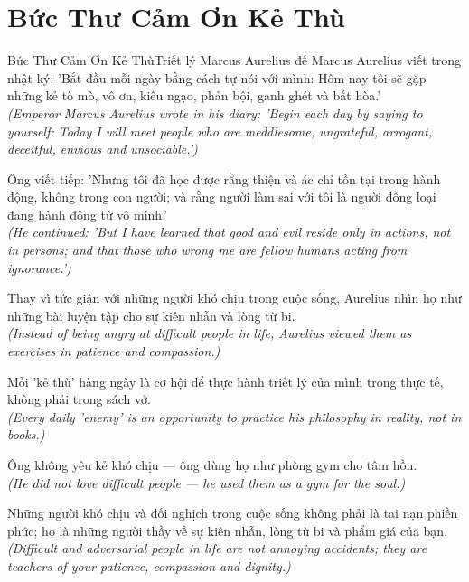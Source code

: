 \section{Bức Thư Cảm Ơn Kẻ Thù}
\begin{truyen}{Bức Thư Cảm Ơn Kẻ Thù}{Triết lý Marcus Aurelius}
 đế Marcus Aurelius viết trong nhật ký: 'Bắt đầu mỗi ngày bằng cách tự nói với mình: Hôm nay tôi sẽ gặp những kẻ tò mò, vô ơn, kiêu ngạo, phản bội, ganh ghét và bất hòa.'\\[4pt]
\textit{(Emperor Marcus Aurelius wrote in his diary: 'Begin each day by saying to yourself: Today I will meet people who are meddlesome, ungrateful, arrogant, deceitful, envious and unsociable.')}

Ông viết tiếp: 'Nhưng tôi đã học được rằng thiện và ác chỉ tồn tại trong hành động, không trong con người; và rằng người làm sai với tôi là người đồng loại đang hành động từ vô minh.'\\[4pt]
\textit{(He continued: 'But I have learned that good and evil reside only in actions, not in persons; and that those who wrong me are fellow humans acting from ignorance.')}

Thay vì tức giận với những người khó chịu trong cuộc sống, Aurelius nhìn họ như những bài luyện tập cho sự kiên nhẫn và lòng từ bi.\\[4pt]
\textit{(Instead of being angry at difficult people in life, Aurelius viewed them as exercises in patience and compassion.)}

Mỗi 'kẻ thù' hàng ngày là cơ hội để thực hành triết lý của mình trong thực tế, không phải trong sách vở.\\[4pt]
\textit{(Every daily 'enemy' is an opportunity to practice his philosophy in reality, not in books.)}

Ông không yêu kẻ khó chịu --- ông dùng họ như phòng gym cho tâm hồn.\\[4pt]
\textit{(He did not love difficult people --- he used them as a gym for the soul.)}

\end{truyen}
\begin{baihoc}
  Những người khó chịu và đối nghịch trong cuộc sống không phải là tai nạn phiền phức; họ là những người thầy về sự kiên nhẫn, lòng từ bi và phẩm giá của bạn.\\[4pt]
  \textit{(Difficult and adversarial people in life are not annoying accidents; they are teachers of your patience, compassion and dignity.)}
\end{baihoc}
